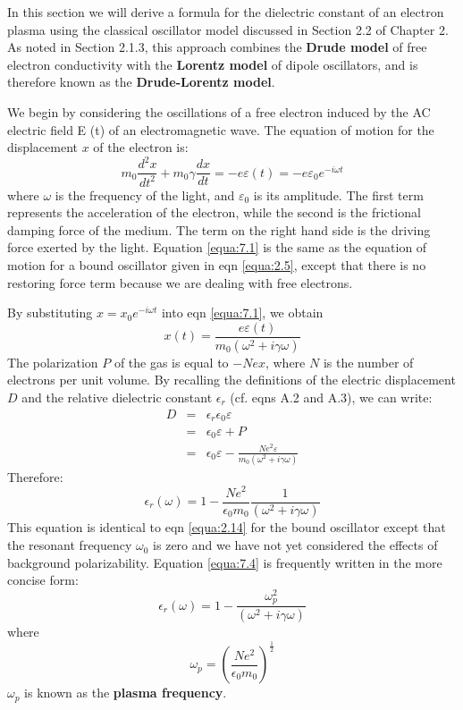 \documentclass[12pt]{book}
\begin{document}
In this section we will derive a formula for the dielectric constant of an electron plasma using the classical oscillator model discussed in Section 2.2 of Chapter 2. As noted in Section 2.1.3, this approach combines the \textbf{Drude model} of free electron conductivity with the \textbf{Lorentz model} of dipole oscillators, and is therefore known as the \textbf{Drude-Lorentz model}.

We begin by considering the oscillations of a free electron induced by the AC electric field E (t) of an electromagnetic wave. The equation of motion for the displacement $x$ of the electron is:
\begin{equation}\label{equa:7.1}
  m_0\frac{d^2x}{dt^2}+m_0\gamma\frac{dx}{dt}=-e\varepsilon(t)=-e\varepsilon_0e^{-i\omega t}
\end{equation}
where $\omega$ is the frequency of the light, and $\varepsilon_0$ is its amplitude. The first term represents the acceleration of the electron, while the second is the frictional damping force of the medium. The term on the right hand side is the driving force exerted by the light. Equation \ref{equa:7.1} is the same as the equation of motion
for a bound oscillator given in eqn \ref{equa:2.5}, except that there is no restoring force term because we are dealing with free electrons.

By substituting $x = x_0e^{-i\omega t}$ into eqn \ref{equa:7.1}, we obtain
\begin{equation}\label{equa:7.2}
  x(t)=\frac{e\varepsilon(t)}{m_0(\omega^2+i\gamma\omega)}
\end{equation}
The polarization $P$ of the gas is equal to $-Nex$, where $N$ is the number of electrons per unit volume. By recalling the definitions of the electric displacement $D$ and the relative dielectric constant $\epsilon_r$ (cf. eqns A.2 and A.3), we can write:
\begin{eqnarray}
\nonumber  D &=& \epsilon_r\epsilon_0\varepsilon \\
\nonumber  &=& \epsilon_0\varepsilon+P \\
   &=& \epsilon_0\varepsilon-\frac{Ne^2\varepsilon}{m_0(\omega^2+i\gamma\omega) }  \label{equa:7.3}
\end{eqnarray}
Therefore:
\begin{equation}\label{equa:7.4}
  \epsilon_r(\omega)=1-\frac{Ne^2}{\epsilon_0m_0}\frac{1}{(\omega^2+i\gamma\omega)}
\end{equation}
This equation is identical to eqn \ref{equa:2.14} for the bound oscillator except that the resonant frequency $\omega_0$ is zero and we have not yet considered the effects of background polarizability. Equation \ref{equa:7.4} is frequently written in the more concise form:
\begin{equation}\label{equa:7.5}
  \epsilon_r(\omega)=1-\frac{\omega_p^2}{(\omega^2+i\gamma\omega)}
\end{equation}
where
\begin{equation}\label{equa:7.6}
  \omega_p=\left(\frac{Ne^2}{\epsilon_0m_0}\right)^{\frac{1}{2}}
\end{equation}
$\omega_p$ is known as the \textbf{plasma frequency}.
\end{document}
